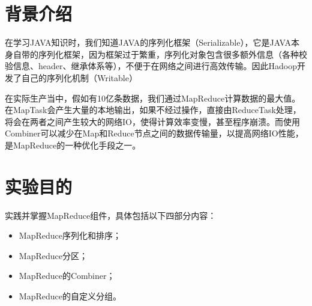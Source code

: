 \documentclass {article}
\begin{document}
	\maketitle{}
	\section{背景介绍}
		在学习JAVA知识时，我们知道JAVA的序列化框架（Serializable），它是JAVA本身自带的序列化框架，因为框架过于繁重，序列化对象包含很多额外信息（各种校验信息、header、继承体系等），不便于在网络之间进行高效传输。因此Hadoop开发了自己的序列化机制（Writable）
		
		在实际生产当中，假如有10亿条数据，我们通过MapReduce计算数据的最大值。在MapTask会产生大量的本地输出，如果不经过操作，直接由ReduceTask处理，将会在两者之间产生较大的网络IO，使得计算效率变慢，甚至程序崩溃。而使用Combiner可以减少在Map和Reduce节点之间的数据传输量，以提高网络IO性能，是MapReduce的一种优化手段之一。
	
	\section{实验目的}
		实践并掌握MapReduce组件，具体包括以下四部分内容：
		\begin{itemize}
			\item MapReduce序列化和排序；
			\item MapReduce分区；
			\item MapReduce的Combiner；
			\item MapReduce的自定义分组。
		\end{itemize}
	
\end{document}
